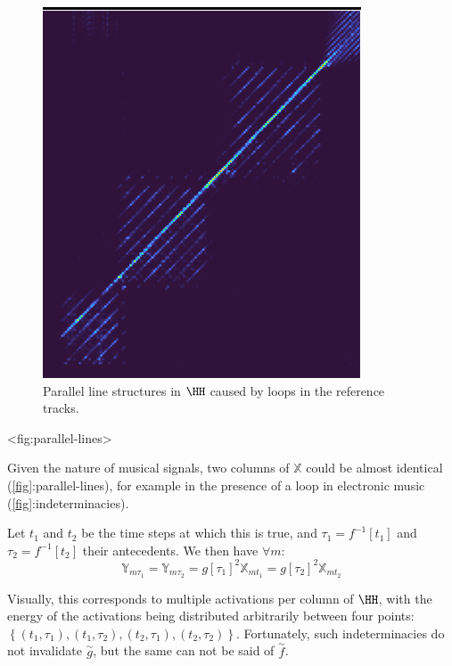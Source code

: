 \begin{figure}
\centering
\includegraphics{../2024-05-17/image-2.png}
\caption{Parallel line structures in \(\HH\) caused by loops in
the reference tracks.}
\end{figure}

\textless fig:parallel-lines\textgreater{}

Given the nature of musical signals, two columns of \(\mathbb{X}\) could
be almost identical (\hyperref[fig]{{[}fig{]}}:parallel-lines), for
example in the presence of a loop in electronic music
(\hyperref[fig]{{[}fig{]}}:indeterminacies).

Let \(t_{1}\) and \(t_{2}\) be the time steps at which this is true, and
\(\tau_{1} = f^{- 1}\left\lbrack t_{1} \right\rbrack\) and
\(\tau_{2} = f^{- 1}\left\lbrack t_{2} \right\rbrack\) their
antecedents. We then have \(\forall m\):
\[{\mathbb{Y}}_{m\tau_{1}} = {\mathbb{Y}}_{m\tau_{2}} = g\left\lbrack \tau_{1} \right\rbrack^{2}{\mathbb{X}}_{mt_{1}} = g\left\lbrack \tau_{2} \right\rbrack^{2}{\mathbb{X}}_{mt_{2}}\]

Visually, this corresponds to multiple activations per column of
\(\HH\), with the energy of the activations being distributed
arbitrarily between four points:
\(\left\{ \left( t_{1},\tau_{1} \right),\left( t_{1},\tau_{2} \right),\left( t_{2},\tau_{1} \right),\left( t_{2},\tau_{2} \right) \right\}\).
Fortunately, such indeterminacies do not invalidate
\(\overset{\sim}{g}\), but the same can not be said of
\(\overset{\sim}{f}\).

